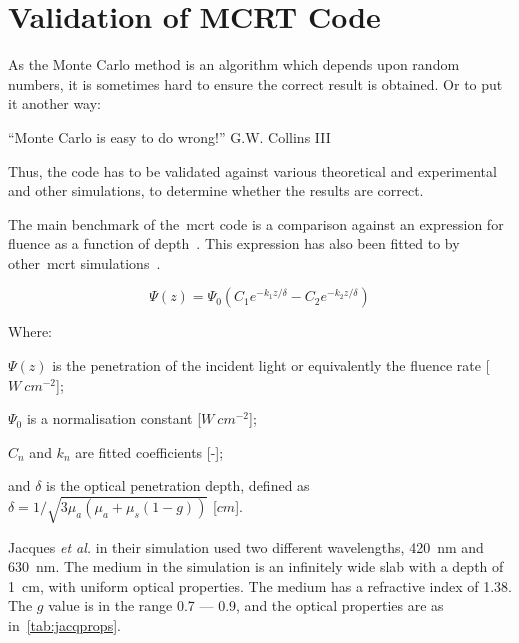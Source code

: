 \FloatBarrier
\section{Validation of MCRT Code}\label{sec:validation}

As the Monte Carlo method is an algorithm which depends upon random numbers, it is sometimes hard to ensure the correct result is obtained.
Or to put it another way:
\medskip

``Monte Carlo is easy to do wrong!'' G.W. Collins III~\cite{bjormaneasymonte}

\medskip

Thus, the code has to be validated against various theoretical and experimental and other simulations, to determine whether the results are correct.

The main benchmark of the~\gls*{mcrt} code is a comparison against an expression for fluence as a function of depth~\cite{gardner1993fluorescence}.
This expression has also been fitted to by other~\gls*{mcrt} simulations~\cite{jacques1993photobleaching}.

\begin{equation}
\Psi(z)=\Psi_0(C_1e^{-k_1z/\delta}-C_2e^{-k_2z/\delta})
\label{eqn:jacqmatch}
\end{equation}

\noindent Where:

\indent $\Psi(z)$ is the penetration of the incident light or equivalently the fluence rate [$W\ cm^{-2}$];

\indent $\Psi_0$ is a normalisation constant [$W\ cm^{-2}$];

\indent $C_n$ and $k_n$ are fitted coefficients [-];

\indent and $\delta$ is the optical penetration depth, defined as $\delta=1/\sqrt{3\mu_a(\mu_a+\mu_s(1-g))}$ [$cm$].

\medskip

Jacques \textit{et al.} in their simulation used two different wavelengths, 420~nm and 630~nm.
The medium in the simulation is an infinitely wide slab with a depth of 1~cm, with uniform optical properties. 
The medium has a refractive index of 1.38.
The $g$ value is in the range 0.7 --- 0.9, and the optical properties are as in~\cref{tab:jacqprops}.

